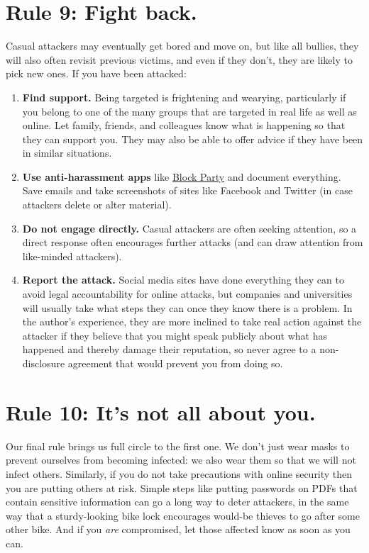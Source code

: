 \documentclass[10pt,letterpaper]{article}
\begin{document}
\section*{Rule 9: Fight back.}

Casual attackers may eventually get bored and move on, but like all bullies,
they will also often revisit previous victims, and even if they don't, they are
likely to pick new ones. If you have been attacked:

\begin{enumerate}
\item
  \textbf{Find support.} Being targeted is frightening and wearying,
  particularly if you belong to one of the many groups that are targeted in real
  life as well as online. Let family, friends, and colleagues know what is
  happening so that they can support you. They may also be able to offer advice
  if they have been in similar situations.

\item
  \textbf{Use anti-harassment apps}
  like \href{https://www.blockpartyapp.com/}{{Block Party}} and document
  everything. Save emails and take screenshots of sites like Facebook and
  Twitter (in case attackers delete or alter material).

\item
  \textbf{Do not engage directly.} Casual attackers are often seeking attention,
  so a direct response often encourages further attacks (and can draw attention
  from like-minded attackers).

\item
  \textbf{Report the attack.} Social media sites have done everything they can
  to avoid legal accountability for online attacks, but companies and
  universities will usually take what steps they can once they know there is a
  problem. In the author's experience, they are more inclined to take real
  action against the attacker if they believe that you might speak publicly
  about what has happened and thereby damage their reputation, so never agree to
  a non-disclosure agreement that would prevent you from doing so.
\end{enumerate}

\section*{Rule 10: It's not all about you.}

Our final rule brings us full circle to the first one. We don't just wear masks
to prevent ourselves from becoming infected: we also wear them so that we will
not infect others. Similarly, if you do not take precautions with online
security then you are putting others at risk.  Simple steps like putting
passwords on PDFs that contain sensitive information can go a long way to deter
attackers, in the same way that a sturdy-looking bike lock encourages would-be
thieves to go after some other bike. And if you \emph{are} compromised, let
those affected know as soon as you can.
\end{document}
